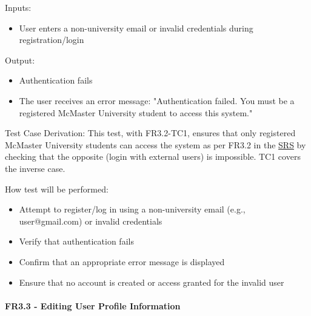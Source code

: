 \documentclass[12pt, titlepage]{article}
\begin{document}
\begin{enumerate}
    Inputs: 
    \begin{itemize}
        \item User enters a non-university email or invalid credentials during registration/login
    \end{itemize}
    
    Output: 
    \begin{itemize}
        \item Authentication fails
        \item The user receives an error message: "Authentication failed. You must be a registered McMaster University student to access this system."
    \end{itemize}
    
    Test Case Derivation: This test, with FR3.2-TC1, ensures that only registered McMaster University students can access the system as per FR3.2 in the \href{https://shorturl.at/FdAgR}{SRS} by checking that the opposite (login with external users) is impossible. TC1 covers the inverse case.
    
    How test will be performed:
    \begin{itemize}
        \item Attempt to register/log in using a non-university email (e.g., user@gmail.com) or invalid credentials
        \item Verify that authentication fails
        \item Confirm that an appropriate error message is displayed
        \item Ensure that no account is created or access granted for the invalid user
    \end{itemize}
\end{enumerate}

\paragraph{FR3.3 - Editing User Profile Information}
\end{document}
